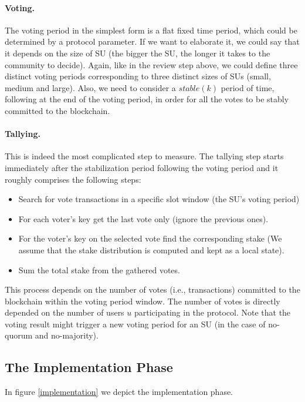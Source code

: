 \paragraph{Voting.} The voting period in the simplest form is a flat fixed time period, which could be determined by a protocol parameter. If we want to elaborate it, we could say that it depends on the size of SU (the bigger the SU, the longer it takes to the community to decide). Again, like in the review step above, we could define three distinct voting periods corresponding to three distinct sizes of SUs (small, medium and large). Also, we need to consider a $stable(k)$ period of time, following at the end of the voting period, in order for all the votes to be stably committed to the blockchain.

\paragraph{Tallying.} This is indeed the most complicated step to measure. The tallying step starts immediately after the stabilization period following the voting period and it roughly comprises the following steps: 
\begin{itemize}
\item Search for vote transactions in a specific slot window (the SU's voting period)
\item For each voter's key get the last vote only (ignore the previous ones).
\item For the voter's key on the selected vote find the corresponding stake (We assume that the stake distribution is computed and kept as a local state).
\item  Sum the total stake from the gathered votes.
\end{itemize}
This process depends on the number of votes (i.e., transactions) committed to the blockchain within the voting period window. The number of votes is directly depended on the number of users $u$ participating in the protocol. %
Note that the voting result might trigger a new voting period for an SU (in the case of no-quorum and no-majority).

\subsection{The Implementation Phase}
In figure \ref{implementation} we depict the implementation phase.

